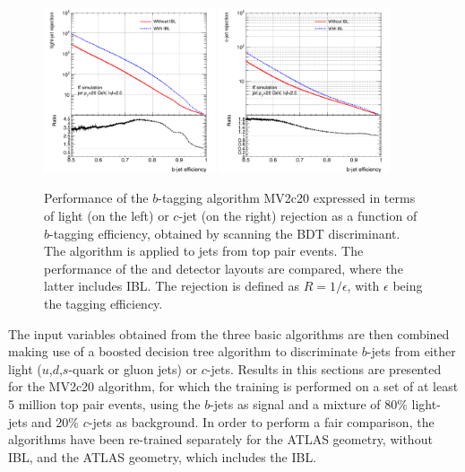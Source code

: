 \begin{figure}
\centering
\includegraphics[width=0.45\textwidth]{Images/IBL_paper/chapter02_Physics/btagging/bVSlight__MV2c20.pdf}
\includegraphics[width=0.45\textwidth]{Images/IBL_paper/chapter02_Physics/btagging/bVSc__MV2c20.pdf}
\caption{\label{fig:btagging_inclusiveROCcurve} Performance of the $b$-tagging algorithm MV2c20 expressed in terms of light (on the left) or $c$-jet (on the right) rejection as a function of $b$-tagging efficiency, obtained by scanning the BDT discriminant. The algorithm is applied to jets from top pair events. The performance of the \runone and \runtwo detector layouts are compared, where the latter includes IBL. The rejection is defined as $R=1/\epsilon$, with $\epsilon$ being the tagging efficiency.}
\end{figure}

The input variables obtained from the three basic algorithms are then combined making use of a boosted decision tree algorithm to discriminate $b$-jets from either light ($u$,$d$,$s$-quark or gluon jets) or $c$-jets. Results in this sections are presented for the MV2c20 algorithm, for which the training is performed on a set of at least 5 million top pair events, using the $b$-jets as signal and a mixture of 80\% light-jets and 20\% $c$-jets as background. In order to perform a fair comparison, the algorithms have been re-trained separately for the ATLAS \runone geometry, without IBL, and the ATLAS \runtwo geometry, which includes the IBL.

